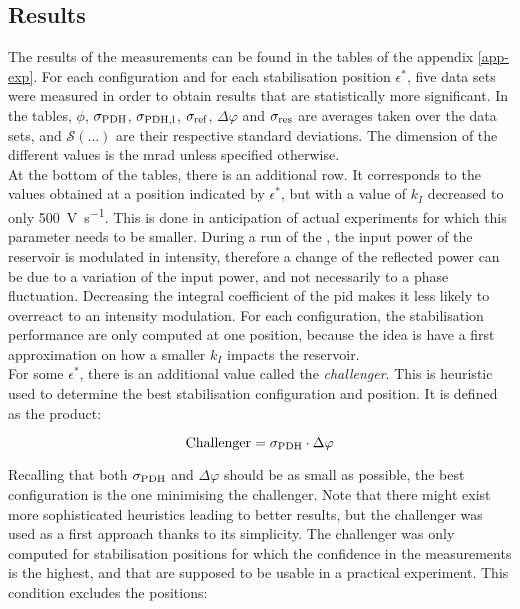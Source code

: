 
\subsection{Results}

The results of the measurements can be found in the tables of the appendix \ref{app-exp}. For each \pdh configuration and for each \pdh stabilisation position $\epsilon^*$, five data sets were measured in order to obtain results that are statistically more significant. In the tables, $\phi$, $\sigma_{\text{PDH}}$, $\sigma_{\text{PDH,l}}$, $\sigma_{\text{ref}}$, $\Delta \varphi$ and $\sigma_{\text{res}}$ are averages taken over the data sets, and $\mathcal{S}(\dots)$ are their respective standard deviations. The dimension of the different values is the \si{\milli\radian} unless specified otherwise.\\

 At the bottom of the tables, there is an additional row. It corresponds to the values obtained at a position indicated by $\epsilon^*$, but with a value of $k_I$ decreased to only \SI{500}{\volt\per\second}. This is done in anticipation of actual \rcer experiments for which this parameter needs to be smaller. During a run of the \rcer, the input power of the reservoir is modulated in intensity, therefore a change of the reflected power can be due to a variation of the input power, and not necessarily to a phase fluctuation. Decreasing the integral coefficient of the \gls{pid} makes it less likely to overreact to an intensity modulation. For each configuration, the stabilisation performance are only computed at one position, because the idea is have a first approximation on how a smaller $k_I$ impacts the reservoir.\\

For some $\epsilon^*$, there is an additional value called the \textit{challenger}. This is heuristic used to determine the best stabilisation configuration and position. It is defined as the product:

\begin{equation}
	\text{Challenger} = \sigma_{\text{PDH}} \cdot \Delta \varphi
\end{equation}

Recalling that both $\sigma_{\text{PDH}}$ and $\Delta \varphi$ should be as small as possible, the best configuration is the one minimising the challenger. Note that there might exist more sophisticated heuristics leading to better results, but the challenger was used as a first approach thanks to its simplicity. The challenger was only computed for stabilisation positions for which the confidence in the measurements is the highest, and that are supposed to be usable in a practical \rc experiment. This condition excludes the positions:

